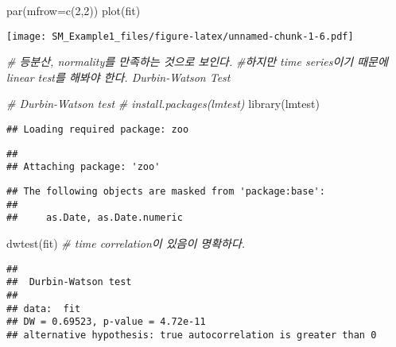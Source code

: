 \documentclass[
]{article}
\newenvironment{Shaded}{\begin{snugshade}}{\end{snugshade}}
\newcommand{\AttributeTok}[1]{\textcolor[rgb]{0.77,0.63,0.00}{#1}}
\newcommand{\CommentTok}[1]{\textcolor[rgb]{0.56,0.35,0.01}{\textit{#1}}}
\newcommand{\DecValTok}[1]{\textcolor[rgb]{0.00,0.00,0.81}{#1}}
\newcommand{\FunctionTok}[1]{\textcolor[rgb]{0.00,0.00,0.00}{#1}}
\newcommand{\NormalTok}[1]{#1}
\begin{document}
\begin{Shaded}
\begin{Highlighting}[]
\FunctionTok{par}\NormalTok{(}\AttributeTok{mfrow=}\FunctionTok{c}\NormalTok{(}\DecValTok{2}\NormalTok{,}\DecValTok{2}\NormalTok{))}
\FunctionTok{plot}\NormalTok{(fit)}
\end{Highlighting}
\end{Shaded}

\texttt{[image: SM\_Example1\_files/figure-latex/unnamed-chunk-1-6.pdf]}

\begin{Shaded}
\begin{Highlighting}[]
\CommentTok{\# 등분산, normality를 만족하는 것으로 보인다. }
\CommentTok{\#하지만 time series이기 때문에 linear test를 해봐야 한다. Durbin{-}Watson Test}

\CommentTok{\# Durbin{-}Watson test}
\CommentTok{\# install.packages(\textquotesingle{}lmtest\textquotesingle{})}
\FunctionTok{library}\NormalTok{(lmtest)}
\end{Highlighting}
\end{Shaded}

\begin{verbatim}
## Loading required package: zoo
\end{verbatim}

\begin{verbatim}
## 
## Attaching package: 'zoo'
\end{verbatim}

\begin{verbatim}
## The following objects are masked from 'package:base':
## 
##     as.Date, as.Date.numeric
\end{verbatim}

\begin{Shaded}
\begin{Highlighting}[]
\FunctionTok{dwtest}\NormalTok{(fit) }\CommentTok{\# time correlation이 있음이 명확하다. }
\end{Highlighting}
\end{Shaded}

\begin{verbatim}
## 
##  Durbin-Watson test
## 
## data:  fit
## DW = 0.69523, p-value = 4.72e-11
## alternative hypothesis: true autocorrelation is greater than 0
\end{verbatim}
\end{document}
